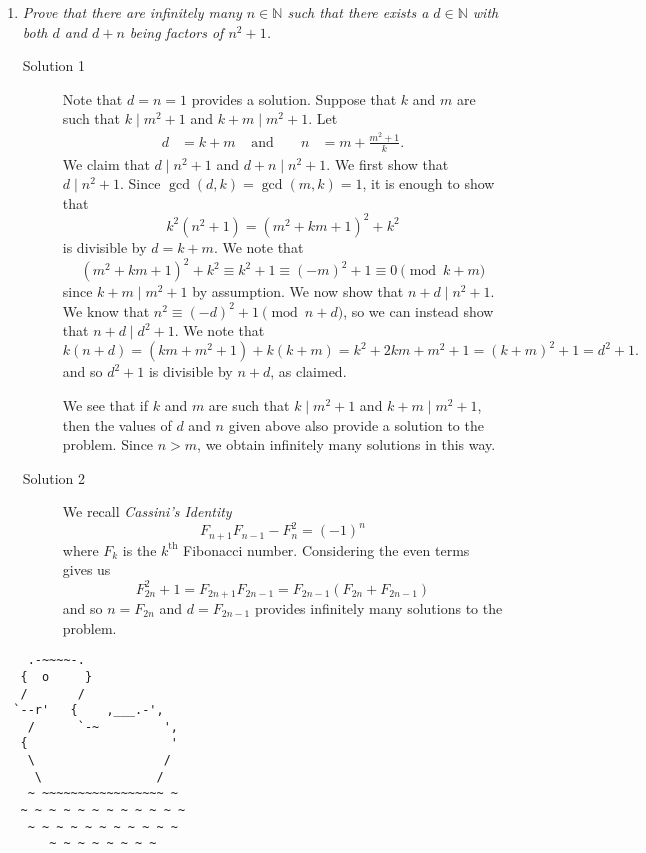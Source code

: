 \documentclass{article}
\begin{document}
\begin{enumerate}[1.]
  
  \item %
  {\itshape Prove that there are infinitely many $n \in \mathbb{N}$ such that there exists a $d \in \mathbb{N}$ with both $d$ and $d + n$ being factors of $n^2 + 1$.}
  
  \begin{description}
    \item[Solution 1] Note that $d = n = 1$ provides a solution. Suppose that $k$ and $m$ are such that $k \mid m^2 + 1$ and $k + m \mid m^2 + 1$. Let
    \begin{align*}
      d & = k + m & \text{ and } && n & = m + \frac{m^2 + 1}{k}.
    \end{align*}
    We claim that $d \mid n^2 + 1$ and $d + n \mid n^2 + 1$. We first show that $d \mid n^2 + 1$. Since $\gcd(d, k) = \gcd(m, k) = 1$, it is enough to show that
    \[
      k^2 (n^2 + 1) = (m^2 + km + 1)^2 + k^2
    \]
    is divisible by $d = k + m$. We note that
    \[
      (m^2 + km + 1)^2 + k^2 \equiv k^2 + 1 \equiv (-m)^2 + 1 \equiv 0 \pmod{k + m}
    \]
    since $k + m \mid m^2 + 1$ by assumption. We now show that $n + d \mid n^2 + 1$. We know that $n^2 \equiv (-d)^2 + 1 \pmod{n + d}$, so we can instead show that $n + d \mid d^2 + 1$. We note that
    \[
      k(n + d) = (km + m^2 + 1) + k(k + m) = k^2 + 2km + m^2 + 1 = (k + m)^2 + 1 = d^2 + 1.
    \]
    and so $d^2 + 1$ is divisible by $n + d$, as claimed.

    We see that if $k$ and $m$ are such that $k \mid m^2 + 1$ and $k + m \mid m^2 + 1$, then the values of $d$ and $n$ given above also provide a solution to the problem. Since $n > m$, we obtain infinitely many solutions in this way.

    \item[Solution 2] We recall \emph{Cassini's Identity}
    \[
      F_{n + 1} F_{n - 1} - F_n^2 = (-1)^n
    \] 
    where $F_k$ is the $k^\text{th}$ Fibonacci number. Considering the even terms gives us
    \[
      F_{2n}^2 + 1 = F_{2n + 1} F_{2n - 1} = F_{2n - 1} (F_{2n} + F_{2n - 1})
    \]
    and so $n = F_{2n}$ and $d = F_{2n - 1}$ provides infinitely many solutions to the problem.
  \end{description}

  \end{enumerate}
  
  \vfill
  \centering
  \begin{BVerbatim}
    .-~~~~-.
   {  o     }
   /       /
  `--r'   {    ,___.-',
    /      `-~         ',
   {                    '
    \                  /
     \                /
    ~ ~~~~~~~~~~~~~~~~~ ~
   ~ ~ ~ ~ ~ ~ ~ ~ ~ ~ ~ ~
    ~ ~ ~ ~ ~ ~ ~ ~ ~ ~ ~
       ~ ~ ~ ~ ~ ~ ~ ~
  \end{BVerbatim}
  
  
\end{document}
